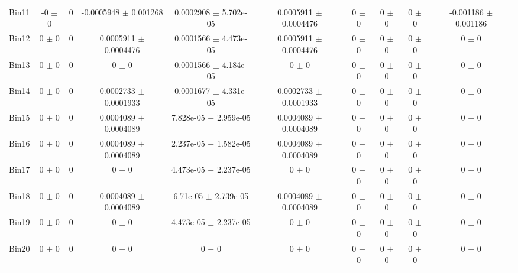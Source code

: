 \begin{tabular}{@{\extracolsep{4pt}}lccccccccc@{}}
     Bin11 & -0 $\pm$ 0 & 0 & -0.0005948 $\pm$ 0.001268 & 0.0002908 $\pm$ 5.702e-05 & 0.0005911 $\pm$ 0.0004476 & 0 $\pm$ 0 & 0 $\pm$ 0 & 0 $\pm$ 0 & -0.001186 $\pm$ 0.001186 \\ 
     Bin12 & 0 $\pm$ 0 & 0 & 0.0005911 $\pm$ 0.0004476 & 0.0001566 $\pm$ 4.473e-05 & 0.0005911 $\pm$ 0.0004476 & 0 $\pm$ 0 & 0 $\pm$ 0 & 0 $\pm$ 0 & 0 $\pm$ 0 \\ 
     Bin13 & 0 $\pm$ 0 & 0 & 0 $\pm$ 0 & 0.0001566 $\pm$ 4.184e-05 & 0 $\pm$ 0 & 0 $\pm$ 0 & 0 $\pm$ 0 & 0 $\pm$ 0 & 0 $\pm$ 0 \\ 
     Bin14 & 0 $\pm$ 0 & 0 & 0.0002733 $\pm$ 0.0001933 & 0.0001677 $\pm$ 4.331e-05 & 0.0002733 $\pm$ 0.0001933 & 0 $\pm$ 0 & 0 $\pm$ 0 & 0 $\pm$ 0 & 0 $\pm$ 0 \\ 
     Bin15 & 0 $\pm$ 0 & 0 & 0.0004089 $\pm$ 0.0004089 & 7.828e-05 $\pm$ 2.959e-05 & 0.0004089 $\pm$ 0.0004089 & 0 $\pm$ 0 & 0 $\pm$ 0 & 0 $\pm$ 0 & 0 $\pm$ 0 \\ 
     Bin16 & 0 $\pm$ 0 & 0 & 0.0004089 $\pm$ 0.0004089 & 2.237e-05 $\pm$ 1.582e-05 & 0.0004089 $\pm$ 0.0004089 & 0 $\pm$ 0 & 0 $\pm$ 0 & 0 $\pm$ 0 & 0 $\pm$ 0 \\ 
     Bin17 & 0 $\pm$ 0 & 0 & 0 $\pm$ 0 & 4.473e-05 $\pm$ 2.237e-05 & 0 $\pm$ 0 & 0 $\pm$ 0 & 0 $\pm$ 0 & 0 $\pm$ 0 & 0 $\pm$ 0 \\ 
     Bin18 & 0 $\pm$ 0 & 0 & 0.0004089 $\pm$ 0.0004089 & 6.71e-05 $\pm$ 2.739e-05 & 0.0004089 $\pm$ 0.0004089 & 0 $\pm$ 0 & 0 $\pm$ 0 & 0 $\pm$ 0 & 0 $\pm$ 0 \\ 
     Bin19 & 0 $\pm$ 0 & 0 & 0 $\pm$ 0 & 4.473e-05 $\pm$ 2.237e-05 & 0 $\pm$ 0 & 0 $\pm$ 0 & 0 $\pm$ 0 & 0 $\pm$ 0 & 0 $\pm$ 0 \\ 
     Bin20 & 0 $\pm$ 0 & 0 & 0 $\pm$ 0 & 0 $\pm$ 0 & 0 $\pm$ 0 & 0 $\pm$ 0 & 0 $\pm$ 0 & 0 $\pm$ 0 & 0 $\pm$ 0 \\ 
\hline\hline
  \end{tabular}
